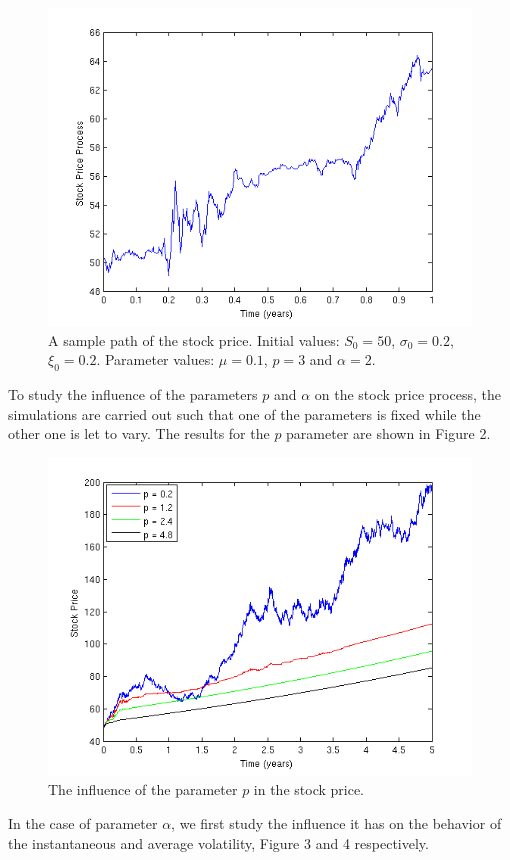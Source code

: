 \documentclass[11pt]{report}
\begin{document}
 \begin{figure}[width=3in, t]
\includegraphics{Figures/sample_path.png}
 \caption{A sample path of the stock price. Initial values: $S_0 = 50$, $\sigma_0 = 0.2$, $\xi_0 = 0.2$. Parameter values: $\mu = 0.1$, $p = 3$ and $\alpha = 2$.}
\end{figure}

To study the influence of the parameters $p$ and $\alpha$ on the stock price process, the simulations are carried out such that one of the parameters is fixed while the other one is let to vary.
The results for the $p$ parameter are shown in Figure 2.
\clearpage

 \begin{figure}[h]
 \includegraphics{Figures/p_effect.png}
 \caption{The influence of the parameter $p$ in the stock price.}
\end{figure}
In the case of parameter $\alpha$, we first study the influence it has on the behavior of the instantaneous and average volatility, Figure 3 and 4 respectively.
\end{document}
